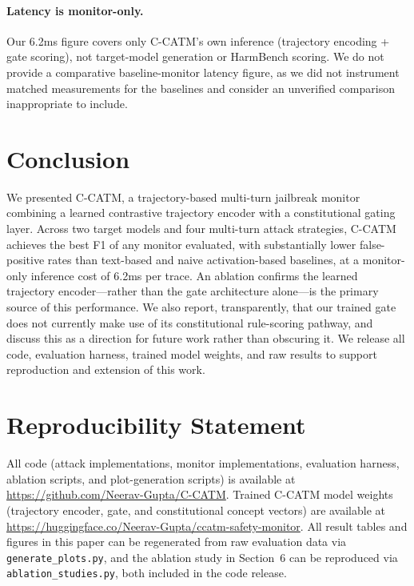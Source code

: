 \documentclass[11pt]{article}
\begin{document}
\paragraph{Latency is monitor-only.} Our 6.2ms figure covers only C-CATM's own inference (trajectory encoding + gate scoring), not target-model generation or HarmBench scoring. We do not provide a comparative baseline-monitor latency figure, as we did not instrument matched measurements for the baselines and consider an unverified comparison inappropriate to include.

\section{Conclusion}

We presented C-CATM, a trajectory-based multi-turn jailbreak monitor combining a learned contrastive trajectory encoder with a constitutional gating layer. Across two target models and four multi-turn attack strategies, C-CATM achieves the best F1 of any monitor evaluated, with substantially lower false-positive rates than text-based and naive activation-based baselines, at a monitor-only inference cost of 6.2ms per trace. An ablation confirms the learned trajectory encoder---rather than the gate architecture alone---is the primary source of this performance. We also report, transparently, that our trained gate does not currently make use of its constitutional rule-scoring pathway, and discuss this as a direction for future work rather than obscuring it. We release all code, evaluation harness, trained model weights, and raw results to support reproduction and extension of this work.

\section*{Reproducibility Statement}

All code (attack implementations, monitor implementations, evaluation harness, ablation scripts, and plot-generation scripts) is available at \url{https://github.com/Neerav-Gupta/C-CATM}. Trained C-CATM model weights (trajectory encoder, gate, and constitutional concept vectors) are available at \url{https://huggingface.co/Neerav-Gupta/ccatm-safety-monitor}. All result tables and figures in this paper can be regenerated from raw evaluation data via \texttt{generate\_plots.py}, and the ablation study in Section~6 can be reproduced via \texttt{ablation\_studies.py}, both included in the code release.
\end{document}
